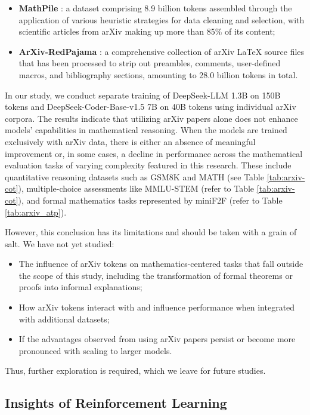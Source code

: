 \begin{itemize}[topsep=0pt]
\begin{itemize}[topsep=0pt]
\begin{itemize}[topsep=0pt]
    \item \textbf{MathPile} \citep{mathpile}: a dataset comprising 8.9 billion tokens assembled through the application of various heuristic strategies for data cleaning and selection, with scientific articles from arXiv making up more than 85\% of its content;
    \item \textbf{ArXiv-RedPajama} \citep{redpajama}: a comprehensive collection of arXiv LaTeX source files that has been processed to strip out preambles, comments, user-defined macros, and bibliography sections, amounting to 28.0 billion tokens in total.
\end{itemize}

In our study, we conduct separate training of DeepSeek-LLM 1.3B on 150B tokens and DeepSeek-Coder-Base-v1.5 7B on 40B tokens using individual arXiv corpora. The results indicate that utilizing arXiv papers alone does not enhance models' capabilities in mathematical reasoning. When the models are trained exclusively with arXiv data, there is either an absence of meaningful improvement or, in some cases, a decline in performance across the mathematical evaluation tasks of varying complexity featured in this research. These include quantitative reasoning datasets such as GSM8K and MATH (see Table \ref{tab:arxiv-cot}), multiple-choice assessments like MMLU-STEM (refer to Table \ref{tab:arxiv-cot}), and formal mathematics tasks represented by miniF2F (refer to Table \ref{tab:arxiv_atp}).

However, this conclusion has its limitations and should be taken with a grain of salt. We have not yet studied:

\begin{itemize}[topsep=0pt]
    \item The influence of arXiv tokens on mathematics-centered tasks that fall outside the scope of this study, including the transformation of formal theorems or proofs into informal explanations;
    \item How arXiv tokens interact with and influence performance when integrated with additional datasets;
    \item If the advantages observed from using arXiv papers persist or become more pronounced with scaling to larger models.
\end{itemize}

Thus, further exploration is required, which we leave for future studies.

\subsection{Insights of Reinforcement Learning}

\end{itemize}
\end{itemize}
